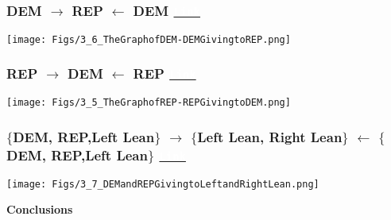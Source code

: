 \documentclass{beamer}
\begin{document}
\begin{frame}
\frametitle{DEM $\rightarrow$ REP $\leftarrow$ DEM   \phantom{This text will be invisibleeee} \href{http://politicalnets.com/view/ddgr}{\texttt{\textcolor{white}{Link}}}}

\begin{center}
\texttt{[image: Figs/3\_6\_TheGraphofDEM-DEMGivingtoREP.png]} \hspace*{4cm}
\end{center}

\end{frame}


\begin{frame}
\frametitle{REP $\rightarrow$ DEM $\leftarrow$ REP   \phantom{This text will be invisibleeee} \href{http://politicalnets.com/view/rrgd}{\texttt{\textcolor{white}{Link}}}}

\begin{center}
\texttt{[image: Figs/3\_5\_TheGraphofREP-REPGivingtoDEM.png]} \hspace*{4cm}
\end{center}

\end{frame}



\begin{frame}
\frametitle{\small $\{$DEM, REP,Left Lean$\}$ $\rightarrow$ $\{$Left Lean, Right Lean$\}$ $\leftarrow$ $\{$DEM, REP,Left Lean$\}$ \phantom{This text will be invisibleeeeThis text will be invisibleeeenvisibleeeeeeeee} \href{http://politicalnets.com/view/drga}{\texttt{\textcolor{white}{Link}}}}

\begin{center}
\texttt{[image: Figs/3\_7\_DEMandREPGivingtoLeftandRightLean.png]} \hspace*{4cm}
\end{center}

\end{frame}









\begin{frame}[plain,c,label=L4]

\begin{center}
\Huge {\bf{\color{brown}Conclusions}}
\end{center}

\end{frame}
\end{document}
